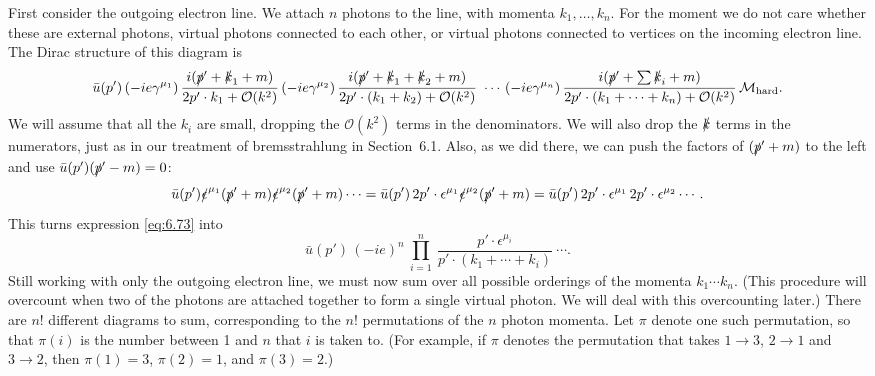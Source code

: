 First consider the outgoing electron line.  We attach $n$ photons to the line,
with momenta $k_1, \ldots, k_n$.  For the moment we do not care whether these
are external photons, virtual photons connected to each other, or virtual
photons connected to vertices on the incoming electron line.  The Dirac
structure of this diagram is
\begin{equation}
  \bar{u}(p')\,(-ie\gamma^{\mu_1})\,
  \frac{i(\slashed{p}'+\slashed{k}_1+m)}{2p'\cdot k_1 + \mathcal{O}(k^2)}\,
  (-ie\gamma^{\mu_2})\,
  \frac{i(\slashed{p}'+\slashed{k}_1+\slashed{k}_2+m)}
    {2p'\cdot(k_1+k_2) + \mathcal{O}(k^2)}\ \cdots\,
  (-ie\gamma^{\mu_n})\,
  \frac{i(\slashed{p}'+\textstyle\sum\slashed{k}_i+m)}
    {2p'\cdot(k_1+\cdots+k_n) + \mathcal{O}(k^2)}\,
  \mathcal{M}_{\mathrm{hard}} .
  \label{eq:6.73}
\end{equation}
We will assume that all the $k_i$ are small, dropping the
$\mathcal{O}(k^2)$ terms in the denominators.  We will also drop the
$\slashed{k}$ terms in the numerators, just as in our treatment of
bremsstrahlung in Section~6.1.  Also, as we did there, we can push the factors
of $(\slashed{p}'+m)$ to the left and use
$\bar{u}(p')(\slashed{p}'-m) = 0$:
\begin{equation}
  \bar{u}(p')\slashed{\epsilon}^{\mu_1}(\slashed{p}'+m)
    \slashed{\epsilon}^{\mu_2}(\slashed{p}'+m)\cdots
  = \bar{u}(p')\,2p'\cdot\epsilon^{\mu_1}\slashed{\epsilon}^{\mu_2}
    (\slashed{p}'+m) = \bar{u}(p')\,2p'\cdot\epsilon^{\mu_1}\,
    2p'\cdot\epsilon^{\mu_2}\cdots .
\end{equation}
This turns expression \eqref{eq:6.73} into
\begin{equation}
  \bar{u}(p')\,(-ie)^n\ \prod_{i=1}^{n}\ \frac{p'\cdot\epsilon^{\mu_i}}
    {p'\cdot(k_1+\cdots+k_i)}\ \cdots .
  \label{eq:6.74}
\end{equation}
Still working with only the outgoing electron line, we must now sum over all
possible orderings of the momenta $k_1\cdots k_n$.  (This procedure will
overcount when two of the photons are attached together to form a single
virtual photon.  We will deal with this overcounting later.)  There are $n!$
different diagrams to sum, corresponding to the $n!$ permutations of the $n$
photon momenta.  Let $\pi$ denote one such permutation, so that $\pi(i)$ is
the number between 1 and $n$ that $i$ is taken to.  (For example, if $\pi$
denotes the permutation that takes $1\to 3$, $2\to 1$ and $3\to 2$, then
$\pi(1) = 3$, $\pi(2) = 1$, and $\pi(3) = 2$.)

